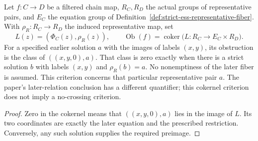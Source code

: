 \begin{lemma}
  \label{lem:strict-solution-cokernel-obstruction}
  \leanok
  Let $f:C\to D$ be a filtered chain map, $R_C,R_D$ the actual groups
  of representative pairs, and $E_C$ the equation group of
  Definition~\ref{def:strict-ess-representative-fiber}.
  With $\rho_R:R_C\to R_D$ the induced representative map, set
  \[
    L(z)=(\Phi_C(z),\rho_R(z)),\qquad
    \operatorname{Ob}(f)=\operatorname{coker}\bigl(L:R_C\to E_C\times R_D\bigr).
  \]
  For a specified earlier solution $a$ with the images of labels $(x,y)$,
  its obstruction is the class of $((x,y,0),a)$.  That class is zero
  exactly when there is a strict solution $b$ with labels $(x,y)$ and
  $\rho_R(b)=a$.  No nonemptiness of the later fiber is assumed.
  This criterion concerns that particular representative pair $a$.
  The paper's later-relation conclusion has a different quantifier; this
  cokernel criterion does not imply a no-crossing criterion.
\end{lemma}
\begin{proof}
  \leanok
  Zero in the cokernel means that $((x,y,0),a)$ lies in the image of $L$.
  Its two coordinates are exactly the later equation and the prescribed
  restriction.  Conversely, any such solution supplies the required preimage.
\end{proof}


